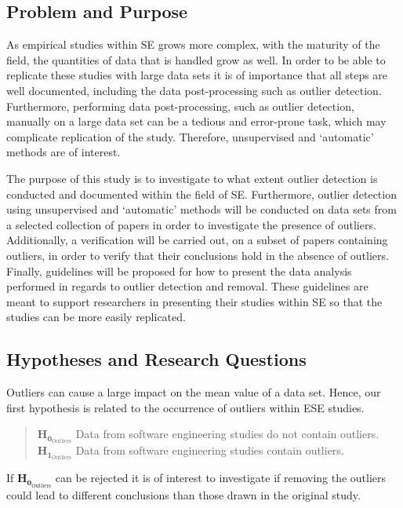 \subsection{Problem and Purpose}
\label{sec:introduction-problem}
As empirical studies within SE grows more complex, with the maturity of the field, the quantities of data that is handled grow as well. In order to be able to replicate these studies with large data sets it is of importance that all steps are well documented, including the data post-processing such as outlier detection. Furthermore, performing data post-processing, such as outlier detection, manually on a large data set can be a tedious and error-prone task, which may complicate replication of the study. Therefore, unsupervised and `automatic' methods are of interest.




The purpose of this study is to investigate to what extent outlier detection is conducted and documented within the field of SE. Furthermore, outlier detection using unsupervised and `automatic' methods will be conducted on data sets from a selected collection of papers in order to investigate the presence of outliers. Additionally, a verification will be carried out, on a subset of papers containing outliers, in order to verify that their conclusions hold in the absence of outliers. Finally, guidelines will be proposed for how to present the data analysis performed in regards to outlier detection and removal. These guidelines are meant to support researchers in presenting their studies within SE so that the studies can be more easily replicated.




\subsection{Hypotheses and Research Questions}
Outliers can cause a large impact on the mean value of a data set. Hence, our first hypothesis is related to the occurrence of outliers within ESE studies.


\begin{quote}
$\mathbf{H_{0_{\mathrm{Outliers}}}}$ Data from software engineering studies do not contain outliers.
\\$\mathbf{H_{1_{\mathrm{Outliers}}}}$ Data from software engineering studies contain outliers.
\end{quote}


If  $\mathbf{H_{0_{\mathrm{Outliers}}}}$ can be rejected it is of interest to investigate if removing the outliers could lead to different conclusions than those drawn in the original study. 


